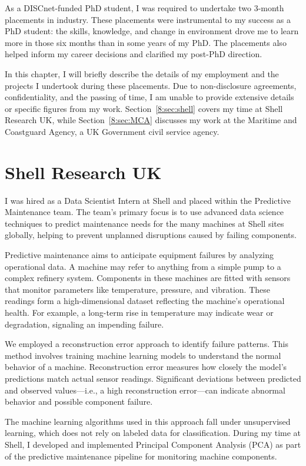 As a DISCnet-funded PhD student, I was required to undertake two 3-month placements in industry. These placements were instrumental to my success as a PhD student: the skills, knowledge, and change in environment drove me to learn more in those six months than in some years of my PhD. The placements also helped inform my career decisions and clarified my post-PhD direction.

In this chapter, I will briefly describe the details of my employment and the projects I undertook during these placements. Due to non-disclosure agreements, confidentiality, and the passing of time, I am unable to provide extensive details or specific figures from my work. Section~\ref{8:sec:shell} covers my time at Shell Research UK, while Section~\ref{8:sec:MCA} discusses my work at the Maritime and Coastguard Agency, a UK Government civil service agency.

\section{\label{8:sec:shell}Shell Research UK}

I was hired as a Data Scientist Intern at Shell and placed within the Predictive Maintenance team. The team’s primary focus is to use advanced data science techniques to predict maintenance needs for the many machines at Shell sites globally, helping to prevent unplanned disruptions caused by failing components.

Predictive maintenance aims to anticipate equipment failures by analyzing operational data. A machine may refer to anything from a simple pump to a complex refinery system. Components in these machines are fitted with sensors that monitor parameters like temperature, pressure, and vibration. These readings form a high-dimensional dataset reflecting the machine's operational health. For example, a long-term rise in temperature may indicate wear or degradation, signaling an impending failure.

We employed a reconstruction error approach to identify failure patterns. This method involves training machine learning models to understand the normal behavior of a machine. Reconstruction error measures how closely the model's predictions match actual sensor readings. Significant deviations between predicted and observed values---i.e., a high reconstruction error---can indicate abnormal behavior and possible component failure.

The machine learning algorithms used in this approach fall under unsupervised learning, which does not rely on labeled data for classification. During my time at Shell, I developed and implemented Principal Component Analysis (PCA) as part of the predictive maintenance pipeline for monitoring machine components.

